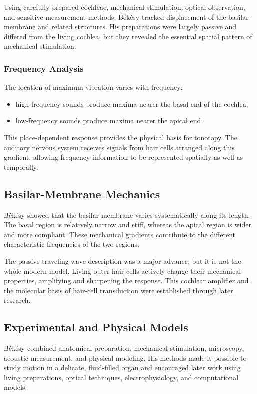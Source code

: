 Using carefully prepared cochleae, mechanical stimulation, optical observation, and sensitive measurement methods, B\'ek\'esy tracked displacement of the basilar membrane and related structures. His preparations were largely passive and differed from the living cochlea, but they revealed the essential spatial pattern of mechanical stimulation.

\subsubsection{Frequency Analysis}

The location of maximum vibration varies with frequency:

\begin{itemize}
\item high-frequency sounds produce maxima nearer the basal end of the cochlea;
\item low-frequency sounds produce maxima nearer the apical end.
\end{itemize}

This place-dependent response provides the physical basis for tonotopy. The auditory nervous system receives signals from hair cells arranged along this gradient, allowing frequency information to be represented spatially as well as temporally.

\subsection{Basilar-Membrane Mechanics}

B\'ek\'esy showed that the basilar membrane varies systematically along its length. The basal region is relatively narrow and stiff, whereas the apical region is wider and more compliant. These mechanical gradients contribute to the different characteristic frequencies of the two regions.

The passive traveling-wave description was a major advance, but it is not the whole modern model. Living outer hair cells actively change their mechanical properties, amplifying and sharpening the response. This cochlear amplifier and the molecular basis of hair-cell transduction were established through later research.

\subsection{Experimental and Physical Models}

B\'ek\'esy combined anatomical preparation, mechanical stimulation, microscopy, acoustic measurement, and physical modeling. His methods made it possible to study motion in a delicate, fluid-filled organ and encouraged later work using living preparations, optical techniques, electrophysiology, and computational models.

